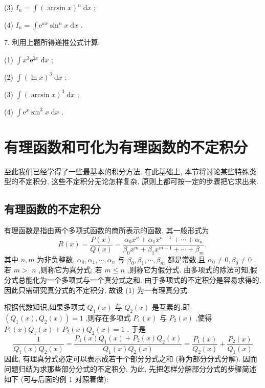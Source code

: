 (3) \({I}_{n} = \int {\left( \arcsin x\right) }^{n}\mathrm{\;d}x\) ;

(4) \({I}_{n} = \int {\mathrm{e}}^{ax}{\sin }^{n}x\mathrm{\;d}x\) .

7. 利用上题所得递推公式计算:

(1) \(\int {x}^{3}{\mathrm{e}}^{2x}\mathrm{\;d}x\) ;

(2) \(\int {\left( \ln x\right) }^{3}\mathrm{\;d}x\) ;

(3) \(\int {\left( \arcsin x\right) }^{3}\mathrm{\;d}x\) ;

(4) \(\int {\mathrm{e}}^{x}{\sin }^{3}x\mathrm{\;d}x\) .

\section{有理函数和可化为有理函数的不定积分}

至此我们已经学得了一些最基本的积分方法. 在此基础上, 本节将讨论某些特殊类型的不定积分, 这些不定积分无论怎样复杂, 原则上都可按一定的步骤把它求出来.

\subsection{有理函数的不定积分}

有理函数是指由两个多项式函数的商所表示的函数, 其一般形式为
\[
R\left( x\right)  = \frac{P\left( x\right) }{Q\left( x\right) } = \frac{{\alpha }_{0}{x}^{n} + {\alpha }_{1}{x}^{n - 1} + \cdots  + {\alpha }_{n}}{{\beta }_{0}{x}^{m} + {\beta }_{1}{x}^{m - 1} + \cdots  + {\beta }_{m}}, \tag{1}
\]
其中 \(n,m\) 为非负整数, \({\alpha }_{0},{\alpha }_{1},\cdots ,{\alpha }_{n}\) 与 \({\beta }_{0},{\beta }_{1},\cdots ,{\beta }_{m}\) 都是常数,且 \({\alpha }_{0} \neq  0,{\beta }_{0} \neq  0\) . 若 \(m >\)  \(n\) ,则称它为真分式; 若 \(m \leq  n\) ,则称它为假分式. 由多项式的除法可知,假分式总能化为一个多项式与一个真分式之和. 由于多项式的不定积分是容易求得的, 因此只需研究真分式的不定积分, 故设 (1) 为一有理真分式.

根据代数知识,如果多项式 \({Q}_{1}\left( x\right)\) 与 \({Q}_{2}\left( x\right)\) 是互素的,即 \(\left( {{Q}_{1}\left( x\right) ,{Q}_{2}\left( x\right) }\right)  = 1\) ,则存在多项式 \({P}_{1}\left( x\right)\) 与 \({P}_{2}\left( x\right)\) ,使得 \({P}_{1}\left( x\right) {Q}_{1}\left( x\right)  + {P}_{2}\left( x\right) {Q}_{2}\left( x\right)  = 1\) . 于是
\[
\frac{1}{{Q}_{1}\left( x\right) {Q}_{2}\left( x\right) } = \frac{{P}_{1}\left( x\right) {Q}_{1}\left( x\right)  + {P}_{2}\left( x\right) {Q}_{2}\left( x\right) }{{Q}_{1}\left( x\right) {Q}_{2}\left( x\right) } = \frac{{P}_{1}\left( x\right) }{{Q}_{2}\left( x\right) } + \frac{{P}_{2}\left( x\right) }{{Q}_{1}\left( x\right) }
\]
因此, 有理真分式必定可以表示成若干个部分分式之和 (称为部分分式分解). 因而问题归结为求那些部分分式的不定积分. 为此, 先把怎样分解部分分式的步骤简述如下 (可与后面的例 1 对照着做):

